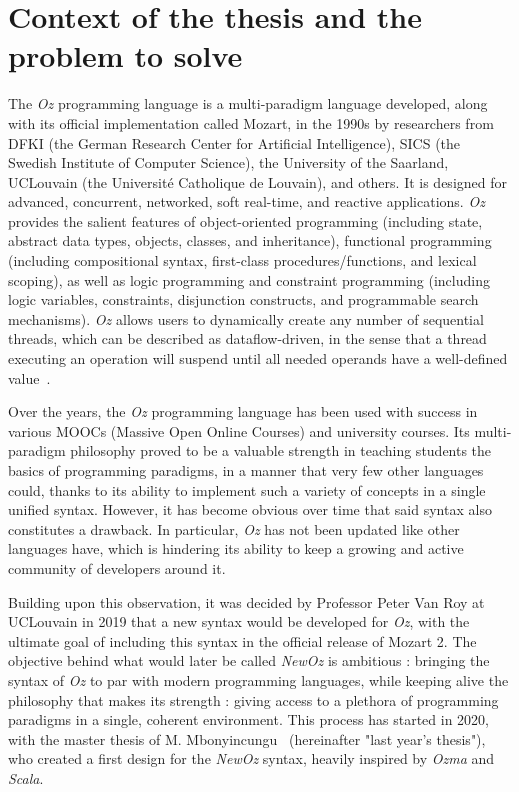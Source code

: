 \section{Context of the thesis and the problem to solve}\label{sec:ch1-context}
The \textit{Oz} programming language is a multi-paradigm language developed, along with its official implementation called Mozart, in the 1990s by researchers from DFKI (the German Research Center for Artificial Intelligence), SICS (the Swedish Institute of Computer Science), the University of the Saarland, UCLouvain (the Université Catholique de Louvain), and others.
It is designed for advanced, concurrent, networked, soft real-time, and reactive applications.
\textit{Oz} provides the salient features of object-oriented programming (including state, abstract data types, objects, classes, and inheritance),
functional programming (including compositional syntax, first-class procedures/functions, and lexical scoping), as well as
logic programming and constraint programming (including logic variables, constraints, disjunction constructs, and programmable search mechanisms).
\textit{Oz} allows users to dynamically create any number of sequential threads, which can be described as dataflow-driven, in the sense that a thread executing an operation will suspend until all needed operands have a well-defined value~\cite{mozart2tutorial}.\newline

Over the years, the \textit{Oz} programming language has been used with success in various MOOCs (Massive Open Online Courses) and university courses.
Its multi-paradigm philosophy proved to be a valuable strength in teaching students the basics of programming paradigms, in a manner that very few other languages could, thanks to its ability to implement such a variety of concepts in a single unified syntax.
However, it has become obvious over time that said syntax also constitutes a drawback.
In particular, \textit{Oz} has not been updated like other languages have, which is hindering its ability to keep a growing and active community of developers around it.\newline

Building upon this observation, it was decided by Professor Peter Van Roy at UCLouvain in 2019 that a new syntax would be developed for \textit{Oz}, with the ultimate goal of including this syntax in the official release of Mozart 2.
The objective behind what would later be called \textit{NewOz} is ambitious : bringing the syntax of \textit{Oz} to par with modern programming languages, while keeping alive the philosophy that makes its strength : giving access to a plethora of programming paradigms in a single, coherent environment.
This process has started in 2020, with the master thesis of M. Mbonyincungu~\cite{jpthesis} (hereinafter "last year's thesis"), who created a first design for the \textit{NewOz} syntax, heavily inspired by \textit{Ozma} and \textit{Scala}.\newline

